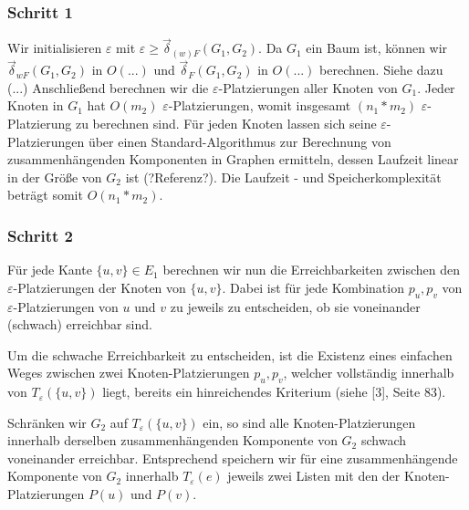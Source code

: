 \documentclass[a4paper, 12pt, twoside]{article}
\theoremstyle{Format1} %
\begin{document}
\subsubsection{Schritt 1} \label{Schritt 1}
Wir initialisieren $\varepsilon$ mit $\varepsilon \geq \vec{\delta}_{(w)F}(G_1, G_2)$.
Da $G_1$ ein Baum ist, können wir
$\vec{\delta}_{wF}(G_1, G_2)$ in $O(...)$ und $\vec{\delta}_F(G_1, G_2)$ in $O(...)$ berechnen. Siehe dazu (...)
Anschließend berechnen wir die $\varepsilon$-Platzierungen aller Knoten von $G_1$. Jeder Knoten in $G_1$ hat $O(m_2)$
$\varepsilon$-Platzierungen, womit insgesamt $(n_1*m_2)$ $\varepsilon$-Platzierung zu berechnen sind.
Für jeden Knoten lassen sich seine $\varepsilon$-Platzierungen über einen Standard-Algorithmus zur Berechnung von
zusammenhängenden Komponenten in Graphen ermitteln, dessen Laufzeit linear in der Größe von $G_2$ ist (?Referenz?).
Die Laufzeit - und Speicherkomplexität beträgt somit $O(n_1*m_2)$.

\subsubsection{Schritt 2} \label{Schritt 2}
Für jede Kante $\{u, v\} \in E_1$ berechnen wir nun die Erreichbarkeiten zwischen den $\varepsilon$-Platzierungen der Knoten von $\{u,v\}$.
Dabei ist für jede Kombination $p_u, p_v$ von $\varepsilon$-Platzierungen von $u$ und $v$ zu jeweils zu entscheiden, ob sie voneinander (schwach) erreichbar sind.

Um die schwache Erreichbarkeit zu entscheiden, ist die Existenz eines einfachen Weges zwischen zwei Knoten-Platzierungen
$p_u,p_v$, welcher vollständig innerhalb von $T_{\varepsilon}(\{u,v\})$ liegt, bereits ein hinreichendes Kriterium (siehe [3], Seite 83).

Schränken wir $G_2$ auf $T_{\varepsilon}(\{u,v\})$ ein, so sind alle Knoten-Platzierungen innerhalb derselben zusammenhängenden Komponente von $G_2$
schwach voneinander erreichbar. Entsprechend speichern wir für eine zusammenhängende Komponente von $G_2$ innerhalb $T_{\varepsilon}(e)$ jeweils zwei Listen mit den
der Knoten-Platzierungen $P(u)$ und $P(v)$.
\end{document}
